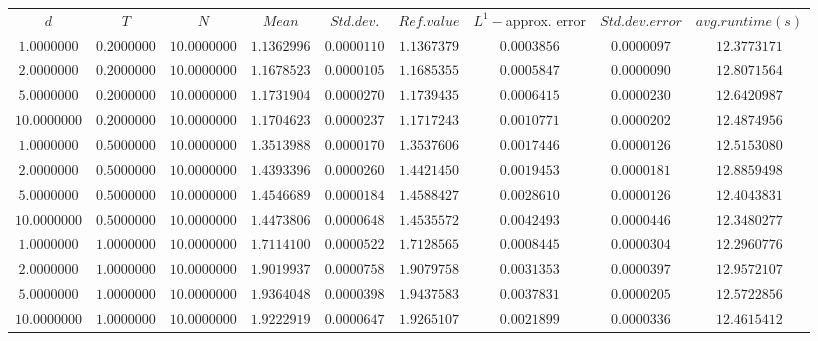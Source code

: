 \begin{tabular}{ccccccccc}
$d$ & $T$ & $N$ & $Mean$ & $Std. dev.$ & $Ref. value$ & $L^1-$approx. error & $Std. dev. error$ & $avg. runtime (s)$\\
$1.0000000$ & $0.2000000$ & $10.0000000$ & $1.1362996$ & $0.0000110$ & $1.1367379$ & $0.0003856$ & $0.0000097$ & $12.3773171$\\
$2.0000000$ & $0.2000000$ & $10.0000000$ & $1.1678523$ & $0.0000105$ & $1.1685355$ & $0.0005847$ & $0.0000090$ & $12.8071564$\\
$5.0000000$ & $0.2000000$ & $10.0000000$ & $1.1731904$ & $0.0000270$ & $1.1739435$ & $0.0006415$ & $0.0000230$ & $12.6420987$\\
$10.0000000$ & $0.2000000$ & $10.0000000$ & $1.1704623$ & $0.0000237$ & $1.1717243$ & $0.0010771$ & $0.0000202$ & $12.4874956$\\
$1.0000000$ & $0.5000000$ & $10.0000000$ & $1.3513988$ & $0.0000170$ & $1.3537606$ & $0.0017446$ & $0.0000126$ & $12.5153080$\\
$2.0000000$ & $0.5000000$ & $10.0000000$ & $1.4393396$ & $0.0000260$ & $1.4421450$ & $0.0019453$ & $0.0000181$ & $12.8859498$\\
$5.0000000$ & $0.5000000$ & $10.0000000$ & $1.4546689$ & $0.0000184$ & $1.4588427$ & $0.0028610$ & $0.0000126$ & $12.4043831$\\
$10.0000000$ & $0.5000000$ & $10.0000000$ & $1.4473806$ & $0.0000648$ & $1.4535572$ & $0.0042493$ & $0.0000446$ & $12.3480277$\\
$1.0000000$ & $1.0000000$ & $10.0000000$ & $1.7114100$ & $0.0000522$ & $1.7128565$ & $0.0008445$ & $0.0000304$ & $12.2960776$\\
$2.0000000$ & $1.0000000$ & $10.0000000$ & $1.9019937$ & $0.0000758$ & $1.9079758$ & $0.0031353$ & $0.0000397$ & $12.9572107$\\
$5.0000000$ & $1.0000000$ & $10.0000000$ & $1.9364048$ & $0.0000398$ & $1.9437583$ & $0.0037831$ & $0.0000205$ & $12.5722856$\\
$10.0000000$ & $1.0000000$ & $10.0000000$ & $1.9222919$ & $0.0000647$ & $1.9265107$ & $0.0021899$ & $0.0000336$ & $12.4615412$\\
\end{tabular}
